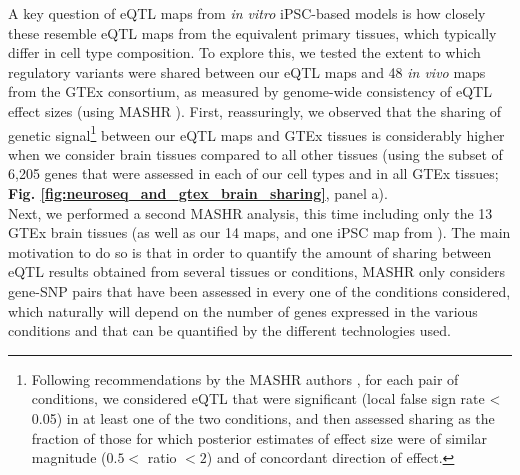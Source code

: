 A key question of eQTL maps from \textit{in vitro} iPSC-based models is how closely these resemble eQTL maps from the equivalent primary tissues, which typically differ in cell type composition. 
To explore this, we tested the extent to which regulatory variants were shared between our eQTL maps and 48 
\textit{in vivo} maps from the GTEx consortium, 
as measured by genome-wide consistency of eQTL effect sizes (using MASHR \cite{urbut2019flexible}).
First, reassuringly, we observed that the sharing of genetic signal\footnote{Following recommendations by the MASHR authors \cite{stephens2020eqtl}, for each pair of conditions, we considered eQTL that were significant (local false sign rate < 0.05) in at least one of the two conditions, and then assessed sharing as the fraction of those for which posterior estimates of effect size were of similar magnitude ($0.5 <$ ratio $<2$) and of concordant direction of effect.} between our eQTL maps and GTEx tissues is considerably higher when we consider brain tissues compared to all other tissues 
(using the subset of 6,205 genes that were assessed in each of our cell types and in all GTEx tissues; \textbf{Fig. \ref{fig:neuroseq_and_gtex_brain_sharing}}, panel a). 
\\




Next, we performed a second MASHR analysis, this time including only the 13 GTEx brain tissues (as well as our 14 maps, and one iPSC map from \cite{bonder2019systematic}). 
The main motivation to do so is that in order to quantify the amount of sharing between eQTL results obtained from several tissues or conditions, MASHR only considers gene-SNP pairs that have been assessed in every one of the conditions considered, which naturally will depend on the number of genes expressed in the various conditions and that can be quantified by the different technologies used. 
\\

